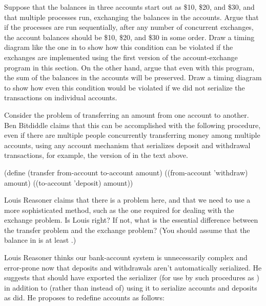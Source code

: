 \begin{exerciseGroup}
\label{Exercise 3.43}
 Suppose that the balances in
three accounts start out as \$10, \$20, and \$30, and that multiple processes run,
exchanging the balances in the accounts.  Argue that if the processes are run
sequentially, after any number of concurrent exchanges, the account balances
should be \$10, \$20, and \$30 in some order.  Draw a timing diagram like the one
in  to show how this condition can be violated if the
exchanges are implemented using the first version of the account-exchange
program in this section.  On the other hand, argue that even with this
 program, the sum of the balances in the accounts will be
preserved.  Draw a timing diagram to show how even this condition would be
violated if we did not serialize the transactions on individual accounts.

\label{Exercise 3.44}
 Consider the problem of
transferring an amount from one account to another.  Ben Bitdiddle claims that
this can be accomplished with the following procedure, even if there are
multiple people concurrently transferring money among multiple accounts, using
any account mechanism that serializes deposit and withdrawal transactions, for
example, the version of  in the text above.

\begin{codeBlock}
(define (transfer from-account to-account amount)
  ((from-account 'withdraw) amount)
  ((to-account 'deposit) amount))
\end{codeBlock}

Louis Reasoner claims that there is a problem here, and that we need to use a
more sophisticated method, such as the one required for dealing with the
exchange problem.  Is Louis right?  If not, what is the essential difference
between the transfer problem and the exchange problem?  (You should assume that
the balance in  is at least .)

\label{Exercise 3.45}
 Louis Reasoner thinks our
bank-account system is unnecessarily complex and error-prone now that deposits
and withdrawals aren't automatically serialized.  He suggests that
 should have exported the serializer (for use
by such procedures as ) in addition to (rather than
instead of) using it to serialize accounts and deposits as 
did.  He proposes to redefine accounts as follows:


\end{exerciseGroup}
